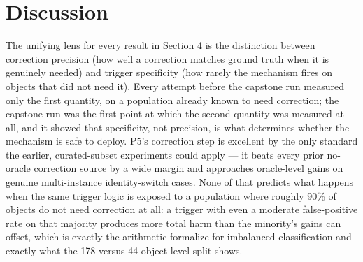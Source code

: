 \documentclass[11pt]{article}
\begin{document}
\section{Discussion}

The unifying lens for every result in Section 4 is the distinction between correction precision (how well a correction matches ground truth when it is genuinely needed) and trigger specificity (how rarely the mechanism fires on objects that did not need it). Every attempt before the capstone run measured only the first quantity, on a population already known to need correction; the capstone run was the first point at which the second quantity was measured at all, and it showed that specificity, not precision, is what determines whether the mechanism is safe to deploy. P5's correction step is excellent by the only standard the earlier, curated-subset experiments could apply — it beats every prior no-oracle correction source by a wide margin and approaches oracle-level gains on genuine multi-instance identity-switch cases. None of that predicts what happens when the same trigger logic is exposed to a population where roughly 90\% of objects do not need correction at all: a trigger with even a moderate false-positive rate on that majority produces more total harm than the minority's gains can offset, which is exactly the arithmetic \citet{saito2015} formalize for imbalanced classification and exactly what the 178-versus-44 object-level split shows.
\end{document}
